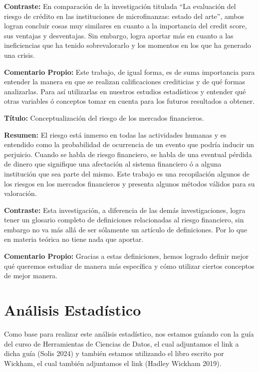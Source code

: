\documentclass[
  letterpaper,
  DIV=11,
  numbers=noendperiod]{scrreprt}
\begin{document}
\textbf{Contraste:} En comparación de la investigación titulada ``La
evaluación del riesgo de crédito en las instituciones de microfinanzas:
estado del arte'', ambos logran concluir cosas muy similares en cuanto a
la importancia del credit score, sus ventajas y desventajas. Sin
embargo, logra aportar más en cuanto a las ineficiencias que ha tenido
sobrevalorarlo y los momentos en los que ha generado una crisis.

\textbf{Comentario Propio:} Este trabajo, de igual forma, es de suma
importancia para entender la manera en que se realizan calificaciones
crediticias y de qué formas analizarlas. Para así utilizarlas en
nuestros estudios estadísticos y entender qué otras variables ó
conceptos tomar en cuenta para los futuros resultados a obtener.

\textbf{Título:} Conceptualización del riesgo de los mercados
financieros.

\textbf{Resumen:} El riesgo está inmerso en todas las actividades
humanas y es entendido como la probabilidad de ocurrencia de un evento
que podría inducir un perjuicio. Cuando se habla de riesgo financiero,
se habla de una eventual pérdida de dinero que signifique una afectación
al sistema financiero ó a alguna institución que sea parte del mismo.
Este trabajo es una recopilación algunos de los riesgos en los mercados
financieros y presenta algunos métodos válidos para su valoración.

\textbf{Contraste:} Esta investigación, a diferencia de las demás
investigaciones, logra tener un glosario completo de definiciones
relacionadas al riesgo financiero, sin embargo no va más allá de ser
sólamente un artículo de definiciones. Por lo que en materia teórica no
tiene nada que aportar.

\textbf{Comentario Propio:} Gracias a estas definiciones, hemos logrado
definir mejor qué queremos estudiar de manera más específica y cómo
utilizar ciertos conceptos de mejor manera.

\section{Análisis Estadístico}\label{anuxe1lisis-estaduxedstico}

Como base para realizar este análisis estadístico, nos estamos guíando
con la guía del curso de Herramientas de Ciencias de Datos, el cual
adjuntamos el link a dicha guía (Solis 2024) y también estamos
utilizando el libro escrito por Wickham, el cual también adjuntamos el
link (Hadley Wickham 2019).
\end{document}
